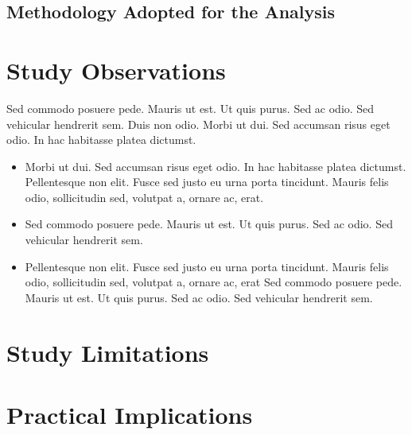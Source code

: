 
\subsection{Methodology Adopted for the Analysis}
\lipsum[3]


\section{Study Observations}
Sed commodo posuere pede. Mauris ut est. Ut quis purus. Sed ac odio. Sed vehicular hendrerit sem. Duis non odio. Morbi ut dui. Sed accumsan risus eget odio. In hac habitasse platea dictumst. 

\begin{itemize}

  \item Morbi ut dui. Sed accumsan risus eget odio. In hac habitasse platea dictumst. Pellentesque non elit. Fusce sed justo eu urna porta tincidunt. Mauris felis odio, sollicitudin sed, volutpat a, ornare ac, erat.
  
  \item Sed commodo posuere pede. Mauris ut est. Ut quis purus. Sed ac odio. Sed vehicular hendrerit sem.
  
  \item Pellentesque non elit. Fusce sed justo eu urna porta tincidunt. Mauris felis odio, sollicitudin sed, volutpat a, ornare ac, erat Sed commodo posuere pede. Mauris ut est. Ut quis purus. Sed ac odio. Sed vehicular hendrerit sem.
  
\end{itemize}


\section{Study Limitations}
\lipsum[7]


\section{Practical Implications}
\lipsum[9]





